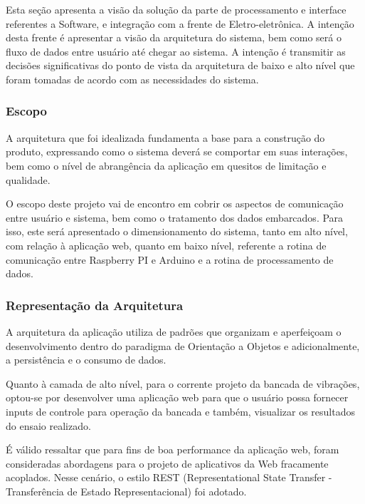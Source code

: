 \label{desenvolvimento_processamento}

Esta seção apresenta a visão da solução da parte de processamento e interface referentes a Software, e integração com a frente de Eletro-eletrônica. A intenção desta frente é apresentar a visão da arquitetura do sistema, bem como será o fluxo de dados entre usuário até chegar ao sistema. A intenção é transmitir as decisões significativas do ponto de vista da arquitetura de baixo e alto nível que foram tomadas de acordo com as necessidades do sistema.

\subsubsection*{\textbf{Escopo}}

A arquitetura que foi idealizada fundamenta a base para a construção do produto, expressando como o sistema deverá se comportar em suas interações, bem como o nível de abrangência da aplicação em quesitos de limitação e qualidade.

O escopo deste projeto vai de encontro em cobrir os aspectos de comunicação entre usuário e sistema, bem como o tratamento dos dados embarcados. Para isso, este será apresentado o dimensionamento do sistema, tanto em alto nível, com relação à aplicação web, quanto em baixo nível, referente a rotina de comunicação entre Raspberry PI e Arduino e a rotina de processamento de dados.

\subsubsection*{\textbf{Representação da Arquitetura}}

A arquitetura da aplicação utiliza de padrões que organizam e aperfeiçoam o desenvolvimento dentro do paradigma de Orientação a Objetos e adicionalmente, a persistência e o consumo de dados.

Quanto à camada de alto nível, para o corrente projeto da bancada de vibrações, optou-se por desenvolver uma aplicação web para que o usuário possa fornecer inputs de controle para operação da bancada e também, visualizar os resultados do ensaio realizado.

É válido ressaltar que para fins de boa performance da aplicação web, foram consideradas abordagens para o projeto de aplicativos da Web fracamente acoplados. Nesse cenário, o estilo REST (Representational State Transfer - Transferência de Estado Representacional)  foi adotado.

